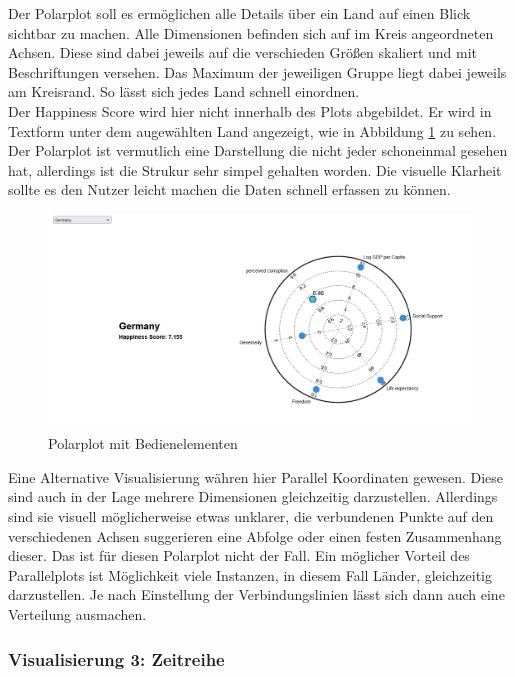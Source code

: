 Der Polarplot soll es ermöglichen alle Details über ein Land auf einen Blick sichtbar zu machen. Alle Dimensionen befinden sich auf im Kreis angeordneten Achsen. Diese sind dabei jeweils auf die verschieden Größen skaliert und mit Beschriftungen versehen. Das Maximum der jeweiligen Gruppe liegt dabei jeweils am Kreisrand. So lässt sich jedes Land schnell einordnen. \\

Der Happiness Score wird hier nicht innerhalb des Plots abgebildet. Er wird in Textform unter dem augewählten Land angezeigt, wie in Abbildung \ref{fig:polarplot} zu sehen. Der Polarplot ist vermutlich eine Darstellung die nicht jeder schoneinmal gesehen hat, allerdings ist die Strukur sehr simpel gehalten worden. Die visuelle Klarheit sollte es den Nutzer leicht machen die Daten schnell erfassen zu können. \\

\begin{figure}[h]
 \centering
 \includegraphics[width = \textwidth]{img/polarplot.jpg}
 \caption{Polarplot mit Bedienelementen}
 \label{fig:polarplot}
\end{figure}


Eine Alternative Visualisierung währen hier Parallel Koordinaten gewesen. Diese sind auch in der Lage mehrere Dimensionen gleichzeitig darzustellen. Allerdings sind sie visuell möglicherweise etwas unklarer, die verbundenen Punkte auf den verschiedenen Achsen suggerieren eine Abfolge oder einen festen Zusammenhang dieser. Das ist für diesen Polarplot nicht der Fall. Ein möglicher Vorteil des Parallelplots ist Möglichkeit viele Instanzen, in diesem Fall Länder, gleichzeitig darzustellen. Je nach Einstellung der Verbindungslinien lässt sich dann auch eine Verteilung ausmachen. 

\subsubsection{Visualisierung 3: Zeitreihe}

